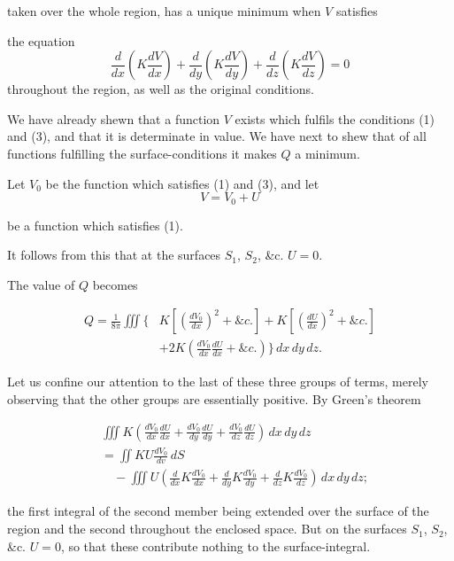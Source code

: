 \documentclass[11pt,a4paper]{article}
\begin{document}
taken over the whole region, has a unique minimum when $V$ satisfies

the equation
\begin{equation}\tag{3}
\frac{d}{dx}\left(K\frac{dV}{dx}\right) + \frac{d}{dy}\left(K\frac{dV}{dy}\right) + \frac{d}{dz}\left(K\frac{dV}{dz}\right) = 0
\end{equation}
throughout the region, as well as the original conditions.

We have already shewn that a function $V$ exists which fulfils the conditions (1) and (3), and that it is determinate in value. We have next to shew that of all functions fulfilling the surface-conditions it makes $Q$ a minimum.

Let $V_0$ be the function which satisfies (1) and (3), and let
\begin{equation}\tag{4}
V = V_0 + U
\end{equation}

be a function which satisfies (1).

It follows from this that at the surfaces $S_1$, $S_2$, \&c. $U=0$.

The value of $Q$ becomes

\begin{equation}\tag{5}
\begin{split}
Q=\frac{1}{8\pi}\iiint \Bigg\{&
K\left[\left(\frac{dV_0}{dx}\right)^2+\&c.\right]
+K\left[\left(\frac{dU}{dx}\right)^2+\&c.\right]\\
&+2K\left(\frac{dV_0}{dx}\frac{dU}{dx}+\&c.\right)
\Bigg\}\,dx\,dy\,dz.
\end{split}
\end{equation}

Let us confine our attention to the last of these three groups of terms, merely observing that the other groups are essentially positive. By Green's theorem

\begin{equation}\tag{6}
\begin{split}
&\iiint K\left(
\frac{dV_0}{dx}\frac{dU}{dx}
+\frac{dV_0}{dy}\frac{dU}{dy}
+\frac{dV_0}{dz}\frac{dU}{dz}\right)\,dx\,dy\,dz\\
&=\iint KU\frac{dV_0}{dv}\,dS\\
&\quad-\iiint U\left(
\frac{d}{dx}K\frac{dV_0}{dx}
+\frac{d}{dy}K\frac{dV_0}{dy}
+\frac{d}{dz}K\frac{dV_0}{dz}\right)\,dx\,dy\,dz;
\end{split}
\end{equation}

the first integral of the second member being extended over the surface of the region and the second throughout the enclosed space. But on the surfaces $S_1$, $S_2$, \&c. $U=0$, so that these contribute nothing to the surface-integral.
\end{document}
